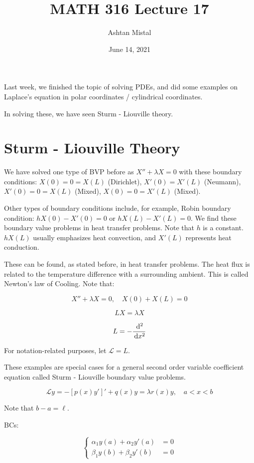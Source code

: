 \documentclass{article}
\title{MATH 316 Lecture 17}
\author{Ashtan Mistal}
\date{June 14, 2021}
\begin{document}
\ifstandalone
\maketitle
\fi

\graphicspath{{./Lecture17/}}

Last week, we finished the topic of solving PDEs, and did some examples on Laplace's equation in polar coordinates / cylindrical coordinates. 

In solving these, we have seen Sturm - Liouville theory. 

\section{Sturm - Liouville Theory}

We have solved one type of BVP before as $X'' + \lambda X = 0$ with these boundary conditions: $X(0) = 0 = X(L)$ (Dirichlet), $X'(0) = X'(L)$ (Neumann), $X'(0) = 0 = X(L)$ (Mixed), $X(0) = 0 = X'(L)$ (Mixed). 

\hfill

Other types of boundary conditions include, for example, Robin boundary condition: $h X(0) - X'(0) = 0$ or $h X(L) - X'(L) = 0$. We find these boundary value problems in heat transfer problems. Note that $h$ is a constant. $h X(L)$ usually emphasizes heat convection, and $X'(L)$ represents heat conduction. 

These can be found, as stated before, in heat transfer problems. The heat flux is related to the temperature difference with a surrounding ambient. This is called Newton's law of Cooling. Note that:

$$X'' + \lambda X = 0, \quad X(0) + X(L) = 0$$

$$LX = \lambda X$$

$$L = - \frac{\,\mathrm{d}^2}{\,\mathrm{d} x^2}$$

For notation-related purposes, let $\mathcal{L} = L$. 

These examples are special cases for a general second order variable coefficient equation called Sturm - Liouville boundary value problems. 

$$\mathcal{L} y = - \left[ p(x) y' \right]' + q(x) y = \lambda r(x) y, \quad a < x < b$$

Note that $b - a = \ell$. 

BCs: 

$$\left\{ \begin{matrix} \alpha_1 y(a) + \alpha_2 y'(a) & = 0 \\ \beta_1 y(b) + \beta_2 y'(b) & = 0 \end{matrix} \right.$$
\end{document}
